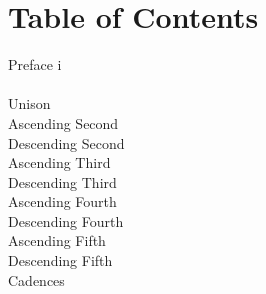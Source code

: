 \clearpage
\thispagestyle{NoHead}
\section*{Table of Contents}


\noindent
Preface \dotfill i\\
\\
Unison \dotfill \pageref{unison} \\
Ascending Second \dotfill \pageref{ascending_second} \\
Descending Second \dotfill \pageref{descending_second} \\
Ascending Third \dotfill \pageref{ascending_third} \\
Descending Third \dotfill \pageref{descending_third} \\
Ascending Fourth \dotfill \pageref{ascending_fourth} \\
Descending Fourth \dotfill \pageref{descending_fourth} \\
Ascending Fifth \dotfill \pageref{ascending_fifth} \\
Descending Fifth \dotfill \pageref{descending_fifth} \\
Cadences \dotfill \pageref{cadences} 
